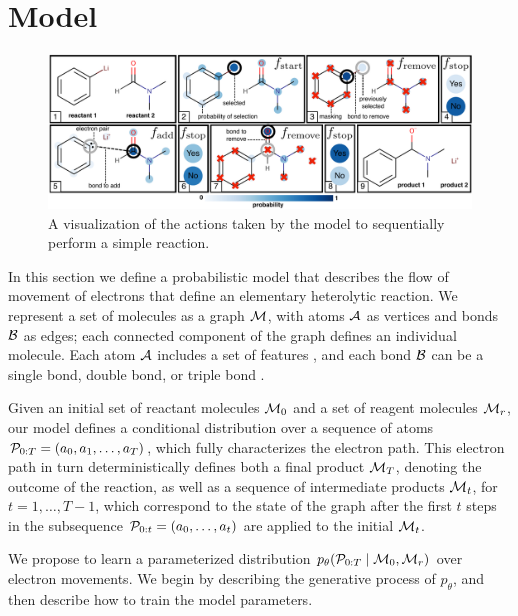 
\section{Model}



\begin{figure}
\centering
\includegraphics[width=\textwidth]{reaction_model_blue}
\caption{A visualization of the actions taken by the model to sequentially perform a simple reaction.}
\label{fig:reaction_model}
\end{figure}



In this section we define a probabilistic model that describes the flow of movement of electrons that define an elementary heterolytic reaction.
We represent a set of molecules as a graph ${\mathcal{M}}$, with atoms ${\mathcal{A}}$ as vertices and bonds ${\mathcal{B}}$ as edges;
each connected component of the graph defines an individual molecule.
Each atom ${\mathcal{A}}$ includes a set of features ,
and each bond ${\mathcal{B}}$ can be a single bond, double bond, or triple bond .

Given an initial set of reactant molecules ${\mathcal{M}}_0$ and a set of reagent molecules ${\mathcal{M}}_r$, 
our model defines a conditional distribution over a sequence of atoms ${\mathcal{P}}_{0:T} = (a_0, a_1, \ldots, a_T)$,
which fully characterizes the electron path.
This electron path in turn deterministically defines both a final product ${\mathcal{M}}_{T}$, 
denoting the outcome of the reaction,
as well as a sequence of intermediate products ${\mathcal{M}}_t$, for $t = 1,\dots,T-1$,
which correspond to the state of the graph after the first $t$ steps in the subsequence ${\mathcal{P}}_{0:t} = (a_0, \dots, a_t)$ are applied to the initial ${\mathcal{M}}_t$.


We propose to learn a parameterized distribution $p_\theta( {\mathcal{P}}_{0:T} \mid {\mathcal{M}}_0, {\mathcal{M}}_r)$ over electron movements. 
We begin by describing the generative process %
of $p_\theta$, and then describe how to train the model parameters.


